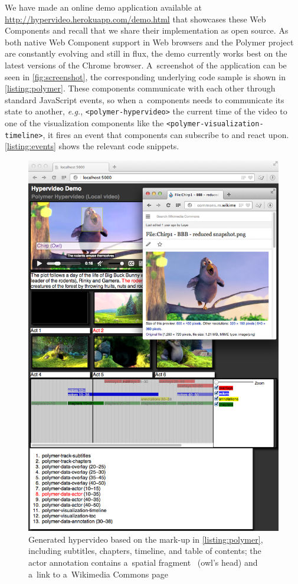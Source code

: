 \documentclass[runningheads,a4paper]{llncs}
\begin{document}
\noindent We have made an online demo application available at
\url{http://hypervideo.herokuapp.com/demo.html} that showcases these Web Components
and recall that we share their implementation as open source.
As both native Web Component support in Web browsers and the Polymer project
are constantly evolving and still in flux, the demo currently works best on
the latest versions of the Chrome browser.
A~screenshot of the application can be seen in \autoref{fig:screenshot},
the corresponding underlying code sample is shown in \autoref{listing:polymer}.
These components communicate with each other through standard JavaScript events,
so when a~components needs to communicate its state to another, \emph{e.g.},
\texttt{<polymer-hypervideo>} the current time of the video to one of the
visualization components like the \texttt{<polymer-visualization-timeline>},
it fires an event that components can subscribe to and react upon.
\autoref{listing:events} shows the relevant code snippets.

\begin{figure}[p!]
  \centering
  \includegraphics[width=1\linewidth]{screenshot}
  \caption{Generated hypervideo based on the mark-up in \autoref{listing:polymer},
  including subtitles, chapters, timeline, and table of contents;
  the actor annotation contains a~spatial fragment~\cite{troncy2012mediafragments}
  (owl's head) and a~link
  to a~Wikimedia Commons page}
  \label{fig:screenshot}
\end{figure}
\end{document}

